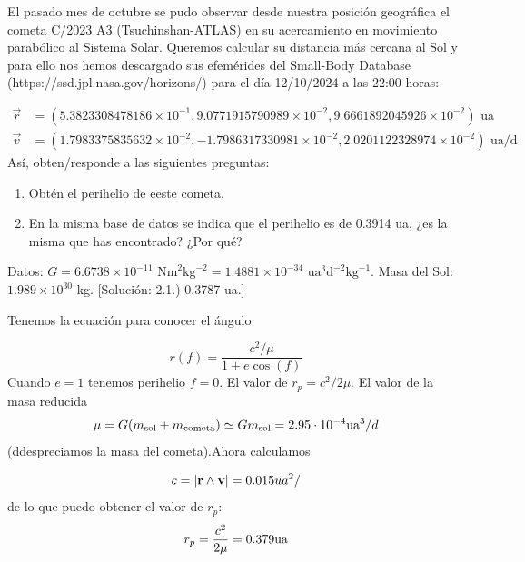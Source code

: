 \begin{texercise}

	El pasado mes de octubre se pudo observar desde nuestra posición geográfica el cometa C/2023 A3 (Tsuchinshan-ATLAS) en su acercamiento en movimiento parabólico al Sistema Solar. Queremos calcular su distancia más cercana al Sol y para ello nos hemos descargado sus efemérides del Small-Body Database (https://ssd.jpl.nasa.gov/horizons/) para el día 12/10/2024 a las 22:00 horas:

	\begin{align*}
		\vec{r} & = (5.3823308478186\times10^{-1}, 9.0771915790989\times10^{-2}, 9.6661892045926\times10^{-2}) \text{ ua}    \\
		\vec{v} & = (1.7983375835632\times10^{-2}, -1.7986317330981\times10^{-2}, 2.0201122328974\times10^{-2}) \text{ ua/d}
	\end{align*}
    Así, obten/responde a las siguientes preguntas:
    \begin{enumerate}[label=\alph*)]
    \item Obtén el perihelio de eeste cometa.
	\item En la misma base de datos se indica que el perihelio es de 0.3914 ua, ¿es la misma que has encontrado? ¿Por qué?
	\end{enumerate}
	Datos: $G = 6.6738 \times 10^{-11} \text{ Nm}^2\text{kg}^{-2} = 1.4881 \times 10^{-34} \text{ ua}^3\text{d}^{-2}\text{kg}^{-1}$. Masa del Sol: $1.989 \times 10^{30}$ kg. [Solución: 2.1.) 0.3787 ua.]
	\tcblower 

	Tenemos la ecuación para conocer el ángulo:

	\begin{equation}
		r(f) = \frac{c^2/ \mu}{1+e\cos(f)}
	\end{equation}
	Cuando $e=1$ tenemos perihelio $f=0$. El valor de $r_p = c^2/2\mu$. El valor de la masa reducida $$\mu=G(m_{\text{sol}}+m_{\text{cometa}})\simeq G m_{\text{sol}} = 2.95\cdot 10^{-4} \text{ua}^3/d$$(ddespreciamos la masa del cometa).Ahora calculamos

	\begin{equation}
		c=|\rn\wedge\vn|=0.015 \*ua^2/
	\end{equation}
	de lo que puedo obtener el valor de $r_p$:
	\begin{equation}
		r_p = \frac{c^2}{2\mu} = 0.379 \text{ua}
	\end{equation}
\end{texercise}


